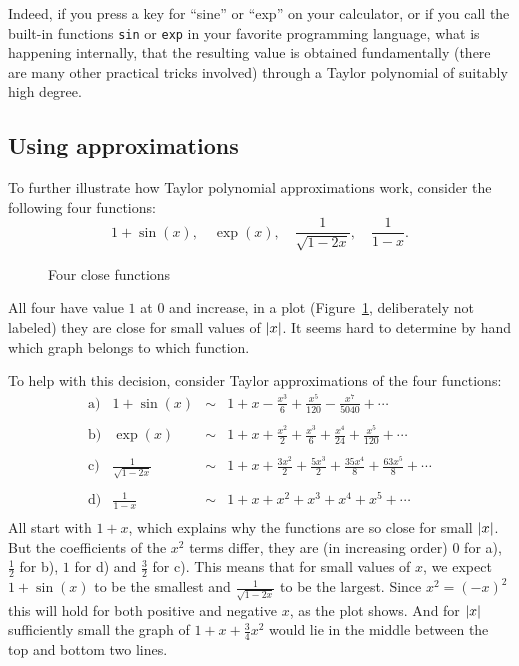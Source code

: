 Indeed, if you press a key for ``sine'' or ``exp'' on your calculator, or if
you call the built-in functions \verb+sin+ or \verb+exp+ in your favorite
programming language, what is happening internally, that the resulting value
is obtained fundamentally (there are many other practical tricks
involved) through a Taylor polynomial of suitably high degree.

\subsection{Using approximations}

To further illustrate how Taylor polynomial approximations work, consider
the following four functions:
\[
1+\sin(x),\quad \exp(x), \quad \frac{1}{\sqrt{1-2x}}, \quad \frac{1}{1-x}.
\]
\begin{figure}
\begin{center}
\end{center}
\caption{Four close functions}
\label{figfourtayapprox}
\end{figure}
All four have value $1$ at $0$ and increase, in a plot
(Figure~\ref{figfourtayapprox}, deliberately not labeled)
they are close for small values of $\left|x\right|$. It seems hard to determine by
hand which graph belongs to which function.

To help with this decision, consider Taylor approximations of the four
functions:
\[
\begin{array}{lrcl}
\mbox{a)}&  1+\sin(x)&\sim&{\displaystyle%
1+x-\frac{x^3}{6}+\frac{x^5}{120}-\frac{x^7}{5040}+\cdots}\\
\\
\mbox{b)}&  \exp(x)&\sim&{\displaystyle%
1+x+\frac{x^2}{2}+\frac{x^3}{6}+\frac{x^4}{24}+\frac{x^5}{120}+\cdots}\\
\\
\mbox{c)}&{\displaystyle  \frac{1}{\sqrt{1-2x}}}&\sim&{\displaystyle%
1+x+\frac{3x^2}{2}+\frac{5x^3}{2}+\frac{35x^4}{8}+\frac{63x^5}{8}+\cdots}\\
\\
\mbox{d)}&{\displaystyle  \frac{1}{1-x}}&\sim&{\displaystyle%
1+x+x^2+x^3+x^4+x^5+\cdots}\\
\end{array}
\]
All start with $1+x$, which explains why the functions are so close for
small $\left|x\right|$. But the coefficients of the $x^2$ terms differ, they are (in
increasing order) $0$ for a), $\frac12$ for b), $1$ for d) and $\frac32$ for
c). This means that for small values of $x$, we expect $1+\sin(x)$ to be the
smallest and $\frac{1}{\sqrt{1-2x}}$ to be the largest. Since $x^2=(-x)^2$
this will hold for both positive and negative $x$, as the plot shows.
And for $\left|x\right|$ sufficiently small the graph of $1+x+\frac34x^2$
would lie in the middle between the top and bottom two lines.

